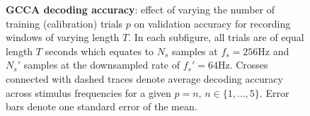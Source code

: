 \begin{figure}[htp]
\caption[GCCA decoding accuracy: effect of varying the number of training (calibration) trials $p$ on validation accuracy for recording windows of varying length $T$.]{\textbf{GCCA decoding accuracy}: effect of varying the number of training (calibration) trials $p$ on validation accuracy for recording windows of varying length $T$. In each subfigure, all trials are of equal length $T$ seconds which equates to $N_s$ samples at $f_s=256$Hz and $N_s'$ samples at the downsampled rate of $f_s'=64$Hz. Crosses connected with dashed traces denote average decoding accuracy across stimulus frequencies for a given $p=n, \, n\in\{1, \dots, 5\}$. Error bars denote one standard error of the mean.}
\label{fig:gcca-acc-nt}
\end{figure}


\begin{figure}[htp]
\hfill
{}


\end{figure}
